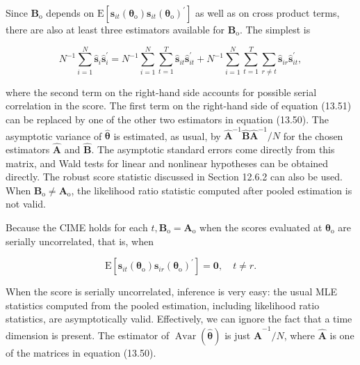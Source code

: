 \documentclass[10pt]{article}
\begin{document}
Since $\mathbf{B}_{\mathrm{o}}$ depends on $\mathrm{E}\left[\mathbf{s}_{i t}\left(\boldsymbol{\theta}_{\mathrm{o}}\right) \mathbf{s}_{i t}\left(\boldsymbol{\theta}_{\mathrm{o}}\right)^{\prime}\right]$ as well as on cross product terms, there are also at least three estimators available for $\mathbf{B}_{\mathrm{o}}$. The simplest is


\begin{equation*}
N^{-1} \sum_{i=1}^{N} \hat{\mathbf{s}}_{i} \hat{\mathbf{s}}_{i}^{\prime}=N^{-1} \sum_{i=1}^{N} \sum_{t=1}^{T} \hat{\mathbf{s}}_{i t} \hat{\mathbf{s}}_{i t}^{\prime}+N^{-1} \sum_{i=1}^{N} \sum_{t=1}^{T} \sum_{r \neq t} \hat{\mathbf{s}}_{i r} \hat{\mathbf{s}}_{i t}^{\prime}, \tag{13.51}
\end{equation*}


where the second term on the right-hand side accounts for possible serial correlation in the score. The first term on the right-hand side of equation (13.51) can be replaced by one of the other two estimators in equation (13.50). The asymptotic variance of $\hat{\boldsymbol{\theta}}$ is estimated, as usual, by $\hat{\mathbf{A}}^{-1} \hat{\mathbf{B}} \hat{\mathbf{A}}^{-1} / N$ for the chosen estimators $\hat{\mathbf{A}}$ and $\hat{\mathbf{B}}$. The asymptotic standard errors come directly from this matrix, and Wald tests for linear and nonlinear hypotheses can be obtained directly. The robust score statistic discussed in Section 12.6.2 can also be used. When $\mathbf{B}_{\mathrm{o}} \neq \mathbf{A}_{\mathrm{o}}$, the likelihood ratio statistic computed after pooled estimation is not valid.

Because the CIME holds for each $t, \mathbf{B}_{\mathrm{o}}=\mathbf{A}_{\mathrm{o}}$ when the scores evaluated at $\boldsymbol{\theta}_{\mathrm{o}}$ are serially uncorrelated, that is, when


\begin{equation*}
\mathrm{E}\left[\mathbf{s}_{i t}\left(\boldsymbol{\theta}_{\mathrm{o}}\right) \mathbf{s}_{i r}\left(\boldsymbol{\theta}_{\mathrm{o}}\right)^{\prime}\right]=\mathbf{0}, \quad t \neq r . \tag{13.52}
\end{equation*}


When the score is serially uncorrelated, inference is very easy: the usual MLE statistics computed from the pooled estimation, including likelihood ratio statistics, are asymptotically valid. Effectively, we can ignore the fact that a time dimension is present. The estimator of $\operatorname{Avar}(\hat{\boldsymbol{\theta}})$ is just $\hat{\mathbf{A}}^{-1} / N$, where $\hat{\mathbf{A}}$ is one of the matrices in equation (13.50).
\end{document}
